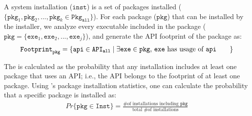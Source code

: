 \label{chap:defs}


\papersection{\Usagemetric{}}
\label{sec:defs:usagemetric}


A system installation ($\mathtt{inst}$)
is a set of packages installed ($\{\mathtt{pkg}_1, \mathtt{pkg}_2, ..., \mathtt{pkg}_k \in \mathtt{Pkg}_\mathtt{all}\}$).
For each package ($\mathtt{pkg}$)  that can be installed by the installer,
we analyze every executable included in the package 
($\mathtt{pkg} = \{\mathtt{exe}_1, \mathtt{exe}_2, ..., \mathtt{exe}_j\}$), and
generate the API footprint of the package as:
\begin{align*}
{\mathtt{Footprint}}_{\mathtt{pkg}} = \{\mathtt{api} \in {\mathtt{API}}_{\mathtt{all}} \mid \text{\parbox{2.3in}{$\exists \mathtt{exe} \in \mathtt{pkg}$,
$\mathtt{exe}$ has usage of $\mathtt{api}$}}\}
\end{align*}

\noindent
The \usagemetric{} is calculated as the probability
that any installation includes
at least one package that uses an API;
i.e.,
the API belongs to the footprint of at least one package.
Using \osdist{}'s package installation statistics, one can calculate the
probability that a specific package is installed as:
\begin{align*}
Pr\{\mathtt{pkg} \in \mathtt{Inst}\} = \frac{\text{\# of installations including $\mathtt{pkg}$}}{\text{total \# of installations}}
\end{align*}

